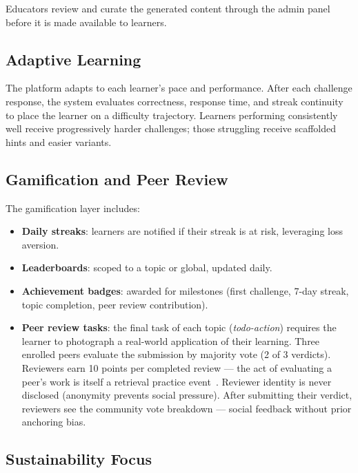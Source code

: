 Educators review and curate the generated content through the admin panel before it is made available to learners.

\subsection{Adaptive Learning}
\label{ssec:adaptive_learning}

The platform adapts to each learner's pace and performance. After each challenge response, the system evaluates correctness, response time, and streak continuity to place the learner on a difficulty trajectory. Learners performing consistently well receive progressively harder challenges; those struggling receive scaffolded hints and easier variants.

\subsection{Gamification and Peer Review}
\label{ssec:gamification_feature}

The gamification layer includes:
\begin{itemize}
    \item \textbf{Daily streaks}: learners are notified if their streak is at risk, leveraging loss aversion.
    \item \textbf{Leaderboards}: scoped to a topic or global, updated daily.
    \item \textbf{Achievement badges}: awarded for milestones (first challenge, 7-day streak, topic completion, peer review contribution).
    \item \textbf{Peer review tasks}: the final task of each topic (\emph{todo-action}) requires the learner to photograph a real-world application of their learning. Three enrolled peers evaluate the submission by majority vote (2 of 3 verdicts). Reviewers earn 10 points per completed review — the act of evaluating a peer's work is itself a retrieval practice event~\cite{roediger2011retrieval}. Reviewer identity is never disclosed (anonymity prevents social pressure). After submitting their verdict, reviewers see the community vote breakdown — social feedback without prior anchoring bias.
\end{itemize}

\subsection{Sustainability Focus}
\label{ssec:sustainability}

